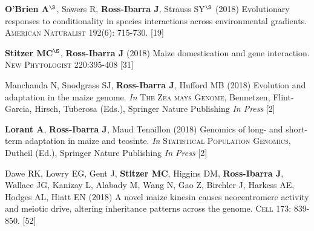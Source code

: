 \documentclass[letterpaper,10pt]{article}
\begin{document}
\begin{etaremune}
\item \textbf{O'Brien A}$^\S$, Sawers R, \textbf{Ross-Ibarra J}, Strauss  SY$^\S$ (2018) Evolutionary responses to conditionality in species interactions across environmental gradients. \textsc{American Naturalist} 192(6): 715-730.
 [19]\\

\item \textbf{Stitzer MC}$^\S$, \textbf{Ross-Ibarra J} (2018) Maize domestication and gene interaction. \textsc{New Phytologist} 220:395-408
 [31]\\

\item Manchanda N, Snodgrass SJ, \textbf{Ross-Ibarra J}, Hufford MB (2018) Evolution and adaptation in the maize genome. \textit{In} \textsc{The Zea mays Genome}, Bennetzen, Flint-Garcia, Hirsch, Tuberosa (Eds.), Springer Nature Publishing \textit{In Press}
 [2]\\

\item \textbf{Lorant A}, \textbf{Ross-Ibarra J}, Maud Tenaillon (2018) Genomics of long- and short- term adaptation in maize and teosinte. \textit{In} \textsc{Statistical Population Genomics},  Dutheil (Ed.), Springer Nature Publishing \textit{In Press}
 [2]\\

\item Dawe RK, Lowry EG, Gent J, \textbf{Stitzer MC}, Higgins DM, \textbf{Ross-Ibarra J}, Wallace JG, Kanizay L, Alabady M, Wang N, Gao Z, Birchler J, Harkess AE, Hodges AL, Hiatt EN (2018) A novel maize kinesin causes neocentromere activity and meiotic drive, altering inheritance patterns across the genome. \textsc{Cell} 173: 839-850.
 [52]\\


\end{etaremune}
\end{document}

